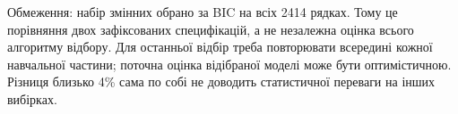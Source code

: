 Обмеження: набір змінних обрано за BIC на всіх 2414 рядках. Тому це
порівняння двох зафіксованих специфікацій, а не незалежна оцінка всього
алгоритму відбору. Для останньої відбір треба повторювати всередині
кожної навчальної частини; поточна оцінка відібраної моделі може бути
оптимістичною. Різниця близько 4\% сама по собі не доводить статистичної
переваги на інших вибірках.

